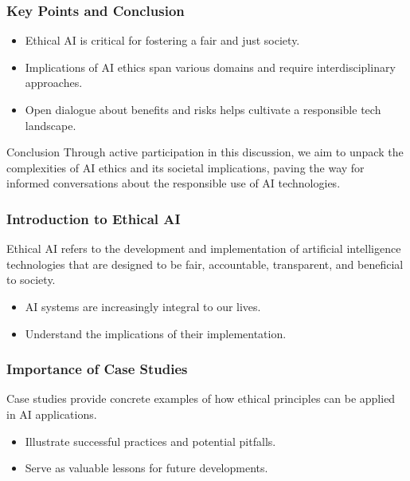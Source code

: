 \documentclass[aspectratio=169]{beamer}
\begin{document}
\begin{frame}[fragile]
    \frametitle{Key Points and Conclusion}
    \begin{itemize}
        \item Ethical AI is critical for fostering a fair and just society.
        \item Implications of AI ethics span various domains and require interdisciplinary approaches.
        \item Open dialogue about benefits and risks helps cultivate a responsible tech landscape.
    \end{itemize}

    \begin{block}{Conclusion}
        Through active participation in this discussion, we aim to unpack the complexities 
        of AI ethics and its societal implications, paving the way for informed conversations 
        about the responsible use of AI technologies.
    \end{block}
\end{frame}

\begin{frame}[fragile]
    \frametitle{Introduction to Ethical AI}
    Ethical AI refers to the development and implementation of artificial intelligence technologies that are designed to be fair, accountable, transparent, and beneficial to society. 
    \begin{itemize}
        \item AI systems are increasingly integral to our lives.
        \item Understand the implications of their implementation.
    \end{itemize}
\end{frame}

\begin{frame}[fragile]
    \frametitle{Importance of Case Studies}
    Case studies provide concrete examples of how ethical principles can be applied in AI applications.
    \begin{itemize}
        \item Illustrate successful practices and potential pitfalls.
        \item Serve as valuable lessons for future developments.
    \end{itemize}
\end{frame}
\end{document}
